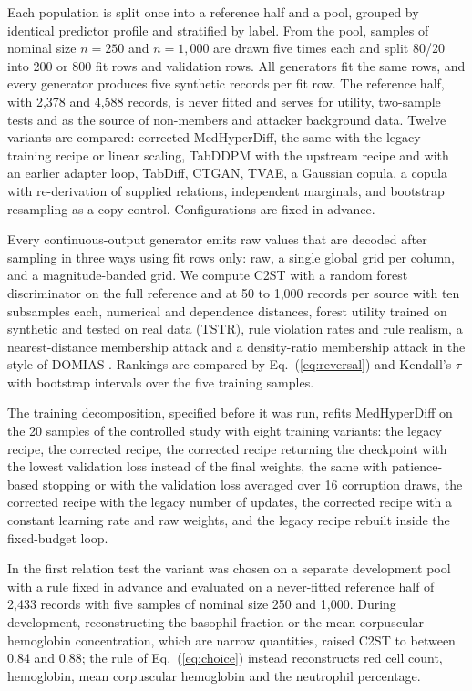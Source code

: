 \documentclass[conference]{IEEEtran}
\begin{document}
Each population is split once into a reference half and a pool, grouped by identical predictor profile and stratified by label. From the pool, samples of nominal size $n = 250$ and $n = 1{,}000$ are drawn five times each and split 80/20 into 200 or 800 fit rows and validation rows. All generators fit the same rows, and every generator produces five synthetic records per fit row. The reference half, with 2,378 and 4,588 records, is never fitted and serves for utility, two-sample tests and as the source of non-members and attacker background data. Twelve variants are compared: corrected MedHyperDiff, the same with the legacy training recipe or linear scaling, TabDDPM with the upstream recipe and with an earlier adapter loop, TabDiff, CTGAN, TVAE, a Gaussian copula, a copula with re-derivation of supplied relations, independent marginals, and bootstrap resampling as a copy control. Configurations are fixed in advance.

Every continuous-output generator emits raw values that are decoded after sampling in three ways using fit rows only: raw, a single global grid per column, and a magnitude-banded grid. We compute C2ST with a random forest discriminator on the full reference and at 50 to 1,000 records per source with ten subsamples each, numerical and dependence distances, forest utility trained on synthetic and tested on real data (TSTR), rule violation rates and rule realism, a nearest-distance membership attack and a density-ratio membership attack in the style of DOMIAS \cite{vanbreugel2023domias}. Rankings are compared by Eq.~(\ref{eq:reversal}) and Kendall's $\tau$ with bootstrap intervals over the five training samples.

The training decomposition, specified before it was run, refits MedHyperDiff on the 20 samples of the controlled study with eight training variants: the legacy recipe, the corrected recipe, the corrected recipe returning the checkpoint with the lowest validation loss instead of the final weights, the same with patience-based stopping or with the validation loss averaged over 16 corruption draws, the corrected recipe with the legacy number of updates, the corrected recipe with a constant learning rate and raw weights, and the legacy recipe rebuilt inside the fixed-budget loop.

In the first relation test the variant was chosen on a separate development pool with a rule fixed in advance and evaluated on a never-fitted reference half of 2,433 records with five samples of nominal size 250 and 1,000. During development, reconstructing the basophil fraction or the mean corpuscular hemoglobin concentration, which are narrow quantities, raised C2ST to between 0.84 and 0.88; the rule of Eq.~(\ref{eq:choice}) instead reconstructs red cell count, hemoglobin, mean corpuscular hemoglobin and the neutrophil percentage.
\end{document}

